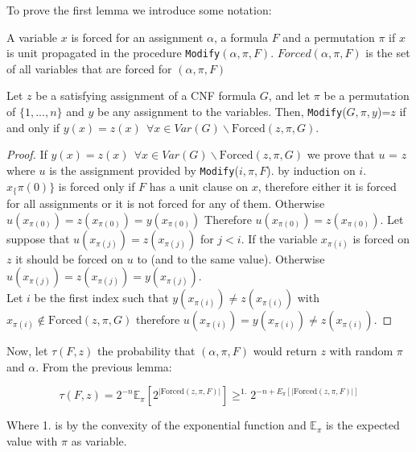 To prove the first lemma we introduce some notation:

\begin{definition}
  A variable $x$ is forced for an assignment $\alpha$, a formula $F$ and a permutation $\pi$ if $x$ is unit propagated in the procedure \texttt{Modify}$(\alpha, \pi, F)$. $Forced(\alpha, \pi, F)$ is the set of all variables that are forced for $(\alpha, \pi, F)$
\end{definition}

\begin{lemma} Let $z$ be a satisfying assignment of a CNF formula $G$, and let $\pi$ be a permutation of $\{1,...,n\}$ and $y$ be any assignment to the variables. Then,  \texttt{Modify}($G,\pi,y$)=$z$ if and only if $y(x) = z(x)\ \  \forall x \in Var(G) \backslash \text{Forced}(z, \pi, G)$.
\end{lemma}

\begin{proof}
  
  If $y(x) = z(x)\ \  \forall x \in Var(G) \backslash \text{Forced}(z, \pi, G)$ we prove that $u$ = $z$ where $u$ is the assignment provided by  \texttt{Modify}($i,\pi,F$). by induction on $i$.  $x_\{\pi(0)\}$ is forced only if $F$ has a unit clause on $x$, therefore either it is forced for all assignments or it is not forced for any of them. Otherwise $u(x_{\pi(0)}) = z(x_{\pi(0)})= y(x_{\pi(0)})$ Therefore $u(x_{\pi(0)}) = z(x_{\pi(0)})$. Let suppose that $u(x_{\pi(j)}) = z(x_{\pi(j)})$ for $j < i$. If the variable $x_{\pi(i)}$ is forced on $z$ it should be forced on $u$ to (and to the same value). Otherwise $u(x_{\pi(j)}) = z(x_{\pi(j)})= y(x_{\pi(j)})$. \\

  Let $i$ be the first index such that $y(x_{\pi(i)})\ne z(x_{\pi(i)})$ with $x_{\pi(i)} \not \in \text{Forced}(z, \pi, G)$ therefore $u(x_{\pi(i)})=y(x_{\pi(i)})\ne z(x_{\pi(i)})$.
\end{proof}

Now, let $\tau(F,z)$ the probability that $(\alpha,\pi,F)$ would return $z$ with random $\pi$ and $\alpha$. From the previous lemma:

$$ \tau(F,z) = 2^{-n} \mathbb{E}_{\pi}[2^{|\text{Forced}(z, \pi, F)|}] \ge^{1.} 2^{-n +E_{\pi}[{|\text{Forced}(z, \pi, F)|}] }$$

Where 1. is by the convexity of the exponential function and $\mathbb{E}_{\pi}$ is the expected value with $\pi$ as variable. \\

